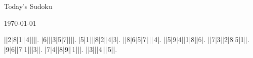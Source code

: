 \documentclass{article}
\begin{document}
\begin{center}
\Huge{Today's Sudoku}
\end{center}
\begin{center}
\Large{\today}
\end{center}
\begin{sudoku}
||2|8|1||4||||.
|6|||3|5|7||||.
|5|1|||8|2||4|3|.
||8|6|5|7||||4|.
||5|9|4||1|8||6|.
||7|3||2|8|5|1||.
|9|6||7|1|||3||.
|7|4||8|9||1|||.
||3|||4|||5||.
\end{sudoku}
\end{document}
